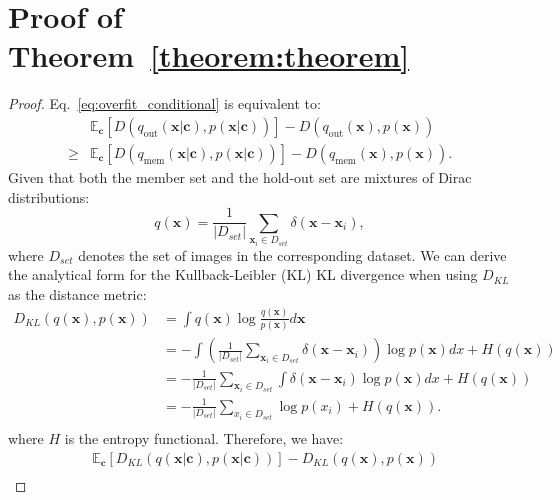 \documentclass{article}
\newcommand{\vect}[1]{\mathbf{#1}}
\theoremstyle{plain}
\theoremstyle{remark}
\begin{document}
\section{Proof of Theorem~\ref{theorem:theorem}}\label{appd: proof}
\begin{proof}
Eq.~\eqref{eq:overfit_conditional} is equivalent to:
\begin{equation}
   \begin{aligned}
       & \mathbb{E}_{\vect{c}}[D(q_{\text{out}}(\vect{x}|\vect{c}), p(\vect{x}|\vect{c}))] -  D(q_{\text{out}}(\vect{x}), p(\vect{x})) \\     \geq  
       &  \mathbb{E}_{\vect{c}}[D(q_{\text{mem}}(\vect{x}|\vect{c}), p(\vect{x}|\vect{c}))] - D(q_{\text{mem}}(\vect{x}), p(\vect{x})).
   \end{aligned}
\label{eq:overfit_conditional_change}
\end{equation}
Given that both the member set and the hold-out set are mixtures of Dirac distributions:
\begin{equation}
    q(\vect{x})=\frac{1}{|D_{set}|} \sum_{\vect{x}_i \in D_{set}} \delta(\vect{x}-\vect{x}_i),
\end{equation}
where \(D_{set}\) denotes the set of images in the corresponding dataset. We can derive the analytical form for the Kullback-Leibler (KL)  KL divergence when using \(D_{KL}\) as the distance metric:
\begin{equation}
    \begin{aligned}
         D_{KL}(q(\vect{x}), p(\vect{x})) 
         &=\int q(\vect{x}) \log \frac{q(\vect{x})}{p(\vect{x})}d\vect{x} \\
        &=- \int (\frac{1}{|D_{set}|} \sum_{\vect{x}_i \in D_{set}} \delta(\vect{x}-\vect{x}_i)) \log p(\vect{x})dx + H(q(\vect{x})) \\
        &=- \frac{1}{|D_{set}|} \sum_{\vect{x}_i \in D_{set}}  \int \delta(\vect{x}-\vect{x}_i) \log p(\vect{x})dx + H(q(\vect{x}))\\
        &=- \frac{1}{|D_{set}|} \sum_{x_i \in D_{set}}  \log p(x_i) + H(q(\vect{x})).\\
    \end{aligned}
\end{equation}
where  \(H\) is the entropy functional. Therefore, we have:
\begin{equation}\label{eq:substi_dirac}
    \begin{aligned}
        &\mathbb{E}_{\vect{c}}[D_{KL}(q(\vect{x}|\vect{c}), p(\vect{x}|\vect{c}))] -  D_{KL}(q(\vect{x}), p(\vect{x})) \\

\end{aligned}
\end{equation}
\end{proof}
\end{document}
